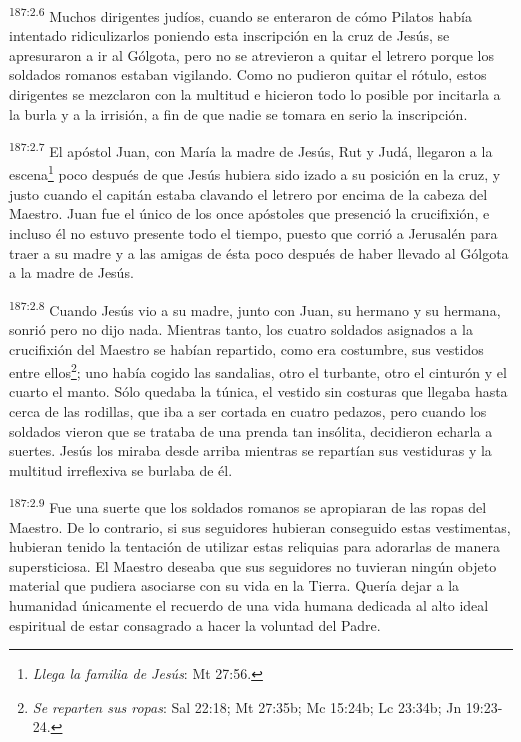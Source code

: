 \par 
\textsuperscript{187:2.6} Muchos dirigentes judíos, cuando se enteraron de cómo Pilatos había intentado ridiculizarlos poniendo esta inscripción en la cruz de Jesús, se apresuraron a ir al Gólgota, pero no se atrevieron a quitar el letrero porque los soldados romanos estaban vigilando. Como no pudieron quitar el rótulo, estos dirigentes se mezclaron con la multitud e hicieron todo lo posible por incitarla a la burla y a la irrisión, a fin de que nadie se tomara en serio la inscripción.

\par 
\textsuperscript{187:2.7} El apóstol Juan, con María la madre de Jesús, Rut y Judá, llegaron a la escena\footnote{\textit{Llega la familia de Jesús}: Mt 27:56.} poco después de que Jesús hubiera sido izado a su posición en la cruz, y justo cuando el capitán estaba clavando el letrero por encima de la cabeza del Maestro. Juan fue el único de los once apóstoles que presenció la crucifixión, e incluso él no estuvo presente todo el tiempo, puesto que corrió a Jerusalén para traer a su madre y a las amigas de ésta poco después de haber llevado al Gólgota a la madre de Jesús.

\par 
\textsuperscript{187:2.8} Cuando Jesús vio a su madre, junto con Juan, su hermano y su hermana, sonrió pero no dijo nada. Mientras tanto, los cuatro soldados asignados a la crucifixión del Maestro se habían repartido, como era costumbre, sus vestidos entre ellos\footnote{\textit{Se reparten sus ropas}: Sal 22:18; Mt 27:35b; Mc 15:24b; Lc 23:34b; Jn 19:23-24.}; uno había cogido las sandalias, otro el turbante, otro el cinturón y el cuarto el manto. Sólo quedaba la túnica, el vestido sin costuras que llegaba hasta cerca de las rodillas, que iba a ser cortada en cuatro pedazos, pero cuando los soldados vieron que se trataba de una prenda tan insólita, decidieron echarla a suertes. Jesús los miraba desde arriba mientras se repartían sus vestiduras y la multitud irreflexiva se burlaba de él.

\par 
\textsuperscript{187:2.9} Fue una suerte que los soldados romanos se apropiaran de las ropas del Maestro. De lo contrario, si sus seguidores hubieran conseguido estas vestimentas, hubieran tenido la tentación de utilizar estas reliquias para adorarlas de manera supersticiosa. El Maestro deseaba que sus seguidores no tuvieran ningún objeto material que pudiera asociarse con su vida en la Tierra. Quería dejar a la humanidad únicamente el recuerdo de una vida humana dedicada al alto ideal espiritual de estar consagrado a hacer la voluntad del Padre.

